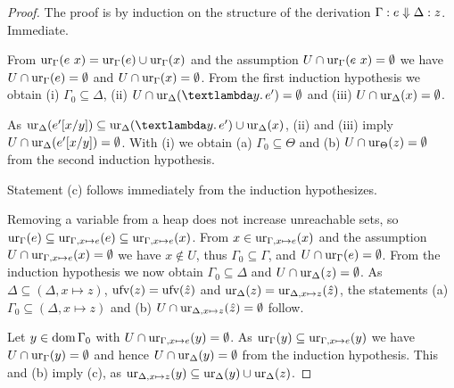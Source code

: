 \documentclass[preprint]{sigplanconf}
\theoremstyle{nonumberplain}
\newtheorem{proof}{Proof}
\begin{document}
\begin{proof} 
The proof is by induction on the structure of the derivation $\Gamma : e \Downarrow \Delta : z$.
Immediate.

From $\text{ur}_{\Gamma}(e\ x) = \text{ur}_{\Gamma}(e) \cup \text{ur}_{\Gamma}(x)$ and the assumption $U \cap \text{ur}_{\Gamma}(e\ x)= \emptyset$ we have $U \cap \text{ur}_{\Gamma}(e) = \emptyset$ and $U \cap \text{ur}_{\Gamma}(x) = \emptyset$. From the first induction hypothesis we obtain (i) $\Gamma_0 \subseteq \Delta$, (ii) $U \cap \ur\Delta {\sLam y e'}= \emptyset$ and (iii) $U \cap \text{ur}_{\Delta}(x) = \emptyset$.

As $\ur\Delta{e'[x/y]} \subseteq \ur\Delta{\sLam ye'} \cup \ur\Delta{x}$, (ii) and (iii) imply $U \cap \text{ur}_{\Delta}(e'[x/y]) = \emptyset$. With (i) we obtain (a) $\Gamma_0\subseteq\Theta$ and (b) $U\cap \text{ur}_{\Theta}(z) = \emptyset$ from the second induction hypothesis.

Statement (c) follows immediately from the induction hypothesizes.

Removing a variable from a heap does not increase unreachable sets, so $\text{ur}_{\Gamma}(e) \subseteq \text{ur}_{\Gamma, x\mapsto e}(e) \subseteq \text{ur}_{\Gamma,x\mapsto e}(x)$. From $x \in \text{ur}_{\Gamma,x \mapsto e}(x)$ and the assumption $U \cap \text{ur}_{\Gamma,x\mapsto e}(x) = \emptyset$ we have $x \notin U$, thus $\Gamma_0 \subseteq \Gamma$, and $U \cap \text{ur}_{\Gamma}(e) = \emptyset$. From the induction hypothesis we now obtain $\Gamma_0 \subseteq \Delta$ and $U \cap \text{ur}_{\Delta}(z) = \emptyset$. As $\Delta \subseteq (\Delta, x \mapsto z)$, $\text{ufv}(z) = \text{ufv}(\hat z)$ and $\text{ur}_{\Delta}(z) = \text{ur}_{\Delta, x \mapsto z}(\hat z)$, the statements (a) $\Gamma_0\subseteq(\Delta,x\mapsto z)$ and (b) $ U\cap \text{ur}_{\Delta, x\mapsto z}(\hat z) = \emptyset$ follow.

Let $y\in \text{dom}\,\Gamma_0$ with $U\cap \text{ur}_{\Gamma,x\mapsto e}(y)=\emptyset$. As $\text{ur}_{\Gamma}(y) \subseteq \text{ur}_{\Gamma,x\mapsto e}(y)$ we have $U\cap\text{ur}_{\Gamma}(y)=\emptyset$ and hence $U\cap\text{ur}_{\Delta}(y)=\emptyset$ from the induction hypothesis. This and (b) imply (c), as $\text{ur}_{\Delta,x\mapsto z}(y) \subseteq \text{ur}_{\Delta}(y) \cup \text{ur}_{\Delta}(z)$.


\end{proof}
\end{document}
